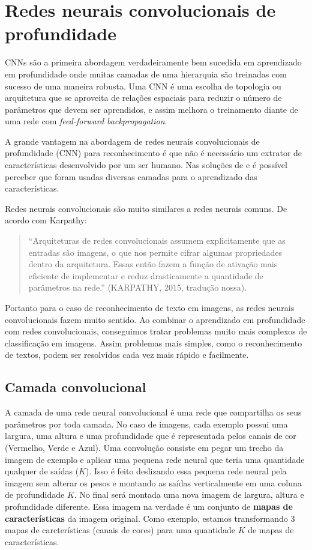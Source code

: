 \section{Redes neurais convolucionais de profundidade}

CNNs são a primeira abordagem verdadeiramente bem sucedida em
aprendizado em profundidade onde muitas camadas de uma hierarquia são
treinadas com sucesso de uma maneira robusta. Uma CNN é uma escolha
de topologia ou arquitetura que se aproveita de relações espaciais
para reduzir o número de parâmetros que devem ser aprendidos, e assim
melhora o treinamento diante de uma rede com \textit{feed-forward
  backpropagation}\cite{Arel2010}.

A grande vantagem na abordagem de redes neurais convolucionais de
profundidade (CNN) para reconhecimento é que não é necessário um
extrator de características desenvolvido por um ser humano. Nas
soluções de \cite{Krizhevsky} e \cite{Goodfellow} é possível perceber
que foram usadas diversas camadas para o aprendizado das
características.

Redes neurais convolucionais são muito similares a redes neurais
comuns. De acordo com Karpathy\cite{Karpathy}:
\begin{quote}
  ``Arquiteturas de redes convolucionais assumem explicitamente que as
  entradas são imagens, o que nos permite cifrar algumas propriedades
  dentro da arquitetura. Essas então fazem a função de ativação mais
  eficiente de implementar e reduz drasticamente a quantidade de
  parâmetros na rede.'' (KARPATHY, 2015, tradução nossa).
\end{quote}

Portanto para o caso de reconhecimento de texto em imagens, as redes
neurais convolucionais fazem muito sentido. Ao combinar o aprendizado
em profundidade com redes convolucionais, conseguimos tratar problemas
muito mais complexos de classificação em imagens. Assim problemas mais
simples, como o reconhecimento de textos, podem ser resolvidos cada
vez mais rápido e facilmente.

\subsection{Camada convolucional}

A camada de uma rede neural convolucional é uma rede que compartilha
os seus parâmetros por toda camada. No caso de imagens, cada exemplo
possui uma largura, uma altura e uma profundidade que é representada
pelos canais de cor (Vermelho, Verde e Azul). Uma convolução consiste
em pegar um trecho da imagem de exemplo e aplicar uma pequena rede
neural que teria uma quantidade qualquer de saídas ($K$). Isso é feito
deslizando essa pequena rede neural pela imagem sem alterar os pesos e
montando as saídas verticalmente em uma coluna de profundidade $K$. No
final será montada uma nova imagem de largura, altura e profundidade
diferente. Essa imagem na verdade é um conjunto de {\bf mapas de
  características} da imagem original. Como exemplo, estamos
transformando 3 mapas de carcterísticas (canais de cores) para uma
quantidade $K$ de mapas de características.

